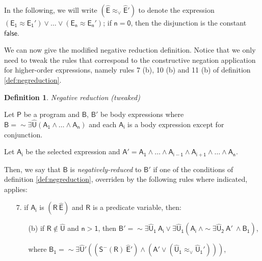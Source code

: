 \documentclass[inscr,ack,preface]{dithesis}
\theoremstyle{definition}
\newtheorem{definition}{Definition}[]
\newcommand{\msf}[1]{$\mathsf{#1}$}
\begin{document}
In the following, we will write \msf{\left( \widehat{E} \approx_{\lor} \widehat{E}' \right)} to denote the expression \msf{ \left( E_{1} \approx E_{1}' \right) \lor \dots \lor \left( E_{n} \approx E_{n}' \right)}; if \msf{n=0}, then the disjunction is the constant \msf{false}.

We can now give the modified negative reduction definition. Notice that we only need to tweak the rules that correspond to the constructive negation application for higher-order expressions, namely rules 7 (b), 10 (b) and 11 (b) of definition \ref{def:negreduction}.

\begin{definition}{\emph{Negative reduction (tweaked)}}
\label{def:negreduction_new}

Let \msf{P} be a program and \msf{B}, \msf{B'} be body expressions where \msf{B = \sim \exists \widehat{U} \left( A_1 \land \dots \land A_n \right)} and each \msf{A_i} is a body expression except for conjunction.

Let \msf{A_i} be the selected expression and \msf{A' = A_1 \land \dots \land A_{i-1} \land A_{i+1} \land \dots \land A_n}.

Then, we say that \msf{B} is \emph{negatively-reduced} to \msf{B'} if one of the conditions of definition \ref{def:negreduction}, overriden by the following rules where indicated, applies:

\begin{enumerate}
  \item[7.] if \msf{A_i} is \msf{\left( R ~ \widehat{E} \right)} and \msf{R} is a predicate variable, then:
        \begin{enumerate}
          \item[(b)] if \msf{R \not \in \widehat{U}} and \msf{n > 1}, then
                \msf{B' = \sim \exists \widehat{U}_1 ~ A_i \lor \exists \widehat{U}_1 \left( A_i ~\land \sim \exists \widehat{U}_2 ~ A' ~\land B_{1} \right)},

                where \msf{B_{1} = \sim\exists \widehat{U}' \left( \left( S^{-}\left( R \right) ~\widehat{E}' \right) \land \left( A' \lor \left( \widehat{U}_{1} \approx_{\lor} \widehat{U}_{1}' \right) \right) \right)},


\end{enumerate}
\end{enumerate}
\end{definition}
\end{document}
